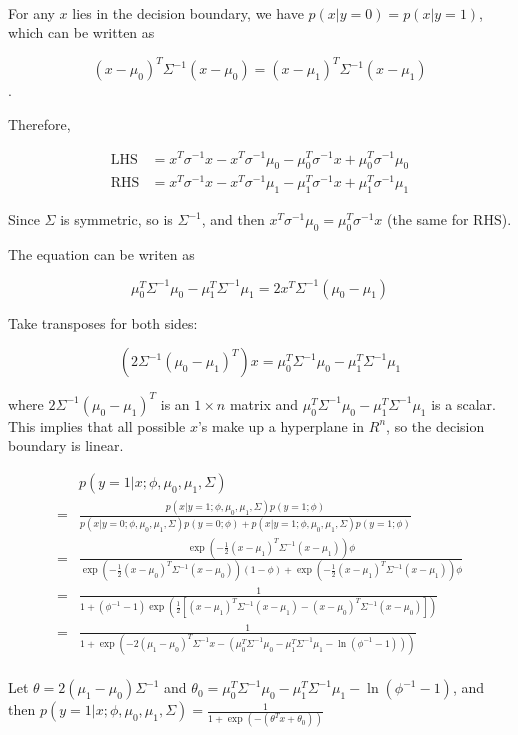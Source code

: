 \begin{answer}
	\\
	For any $x$ lies in the decision boundary, we have $p(x|y=0)=p(x|y=1)$, which can be written as
	
	$$
	(x - \mu_0)^T \Sigma^{-1} (x - \mu_0)=(x - \mu_1)^T \Sigma^{-1} (x - \mu_1)
	$$.
	
	Therefore,
	
	\begin{align*}
		\mathrm{LHS} &= x^T \sigma^{-1} x - x^T \sigma^{-1} \mu_0 - \mu_0^T \sigma^{-1} x + \mu_0^T \sigma^{-1} \mu_0\\
		\mathrm{RHS} &= x^T \sigma^{-1} x - x^T \sigma^{-1} \mu_1 - \mu_1^T \sigma^{-1} x + \mu_1^T \sigma^{-1} \mu_1
	\end{align*}
	
	Since $\Sigma$ is symmetric, so is $\Sigma^{-1}$, and then $x^T \sigma^{-1} \mu_0 = \mu_0^T \sigma^{-1} x$ (the same for $\mathrm{RHS}$).
	
	The equation can be writen as
	
	$$
	\mu_0^T \Sigma^{-1} \mu_0 - \mu_1^T \Sigma^{-1} \mu_1 = 2x^T \Sigma^{-1} (\mu_0 - \mu_1)
	$$
	
	Take transposes for both sides:
	
	$$
	\left(2\Sigma^{-1} (\mu_0 - \mu_1)^T\right) x = \mu_0^T \Sigma^{-1} \mu_0 - \mu_1^T \Sigma^{-1} \mu_1
	$$
	
	where $2\Sigma^{-1} (\mu_0 - \mu_1)^T$ is an $1 \times n$ matrix and $\mu_0^T \Sigma^{-1} \mu_0 - \mu_1^T \Sigma^{-1} \mu_1$ is a scalar. This implies that all possible $x$'s make up a hyperplane in $R^n$, so the decision boundary is linear.
	
	\begin{align*}
		& p(y = 1|x; \phi, \mu_0, \mu_1, \Sigma)\\
		= & \frac{p(x|y = 1; \phi, \mu_0, \mu_1, \Sigma)p(y = 1; \phi)}{p(x|y = 0; \phi, \mu_0, \mu_1, \Sigma)p(y = 0; \phi) + p(x|y = 1; \phi, \mu_0, \mu_1, \Sigma)p(y = 1; \phi)}\\
		= & \frac{\exp\left(-\frac{1}{2}(x-\mu_1)^T \Sigma^{-1} (x-\mu_1) \right) \phi}{\exp\left(-\frac{1}{2}(x-\mu_{0})^T \Sigma^{-1} (x-\mu_{0})\right) (1 - \phi) + \exp\left(-\frac{1}{2}(x-\mu_1)^T \Sigma^{-1} (x-\mu_1) \right) \phi}\\
		= & \frac{1}{1 + (\phi^{-1} - 1) \exp\left(\frac{1}{2}\left[(x-\mu_1)^T \Sigma^{-1} (x-\mu_1) - (x-\mu_0)^T \Sigma^{-1} (x-\mu_0)  \right]\right)}\\
		= & \frac{1}{1 + \exp\left(-2 (\mu_1 - \mu_0)^T \Sigma^{-1} x - (\mu_0^T \Sigma^{-1} \mu_0 - \mu_1^T \Sigma^{-1} \mu_1 - \ln (\phi^{-1} - 1))\right)}\\
	\end{align*}
	
	Let $\theta = 2 (\mu_1 - \mu_0) \Sigma^{-1}$ and $\theta_0 = \mu_0^T \Sigma^{-1} \mu_0 - \mu_1^T \Sigma^{-1} \mu_1 - \ln (\phi^{-1} - 1)$, and then $p(y = 1|x; \phi, \mu_0, \mu_1, \Sigma) = \frac{1}{1 + \exp(-(\theta^T x + \theta_0))}$
\end{answer}